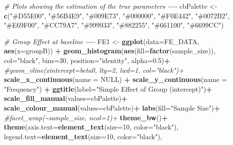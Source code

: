 \documentclass[
]{article}
\newenvironment{Shaded}{\begin{snugshade}}{\end{snugshade}}
\newcommand{\AttributeTok}[1]{\textcolor[rgb]{0.13,0.29,0.53}{#1}}
\newcommand{\CommentTok}[1]{\textcolor[rgb]{0.56,0.35,0.01}{\textit{#1}}}
\newcommand{\ConstantTok}[1]{\textcolor[rgb]{0.56,0.35,0.01}{#1}}
\newcommand{\DecValTok}[1]{\textcolor[rgb]{0.00,0.00,0.81}{#1}}
\newcommand{\FloatTok}[1]{\textcolor[rgb]{0.00,0.00,0.81}{#1}}
\newcommand{\FunctionTok}[1]{\textcolor[rgb]{0.13,0.29,0.53}{\textbf{#1}}}
\newcommand{\NormalTok}[1]{#1}
\newcommand{\OtherTok}[1]{\textcolor[rgb]{0.56,0.35,0.01}{#1}}
\newcommand{\SpecialCharTok}[1]{\textcolor[rgb]{0.81,0.36,0.00}{\textbf{#1}}}
\newcommand{\StringTok}[1]{\textcolor[rgb]{0.31,0.60,0.02}{#1}}
\begin{document}
\begin{Shaded}
\begin{Highlighting}[]
\CommentTok{\# Plots showing the estimation of the true parameters {-}{-}{-}{-}}
\NormalTok{cbPalette }\OtherTok{\textless{}{-}} \FunctionTok{c}\NormalTok{(}\StringTok{"\#D55E00"}\NormalTok{, }\StringTok{"\#56B4E9"}\NormalTok{, }\StringTok{"\#009E73"}\NormalTok{, }\StringTok{"\#000000"}\NormalTok{, }
               \StringTok{"\#F0E442"}\NormalTok{, }\StringTok{"\#0072B2"}\NormalTok{, }\StringTok{"\#E69F00"}\NormalTok{, }\StringTok{"\#CC79A7"}\NormalTok{,}
               \StringTok{"\#999933"}\NormalTok{, }\StringTok{"\#882255"}\NormalTok{, }\StringTok{"\#661100"}\NormalTok{, }\StringTok{"\#6699CC"}\NormalTok{)}


\CommentTok{\# Group Effect at baseline {-}{-}{-}{-}}
\NormalTok{FE1 }\OtherTok{\textless{}{-}} \FunctionTok{ggplot}\NormalTok{(}\AttributeTok{data=}\NormalTok{FE\_DATA, }\FunctionTok{aes}\NormalTok{(}\AttributeTok{x=}\NormalTok{groupB)) }\SpecialCharTok{+}
  \FunctionTok{geom\_histogram}\NormalTok{(}\FunctionTok{aes}\NormalTok{(}\AttributeTok{fill=}\FunctionTok{factor}\NormalTok{(sample\_size)), }\AttributeTok{col=}\StringTok{"black"}\NormalTok{, }\AttributeTok{bins=}\DecValTok{30}\NormalTok{,}
                 \AttributeTok{position=}\StringTok{"identity"}\NormalTok{, }\AttributeTok{alpha=}\FloatTok{0.5}\NormalTok{)}\SpecialCharTok{+}
  \CommentTok{\#geom\_vline(xintercept=beta0, lty=2, lwd=1, col="black")+}
  \FunctionTok{scale\_x\_continuous}\NormalTok{(}\AttributeTok{name =} \ConstantTok{NULL}\NormalTok{) }\SpecialCharTok{+}
  \FunctionTok{scale\_y\_continuous}\NormalTok{(}\AttributeTok{name =} \StringTok{"Frequency"}\NormalTok{) }\SpecialCharTok{+}
  \FunctionTok{ggtitle}\NormalTok{(}\AttributeTok{label=}\StringTok{"Simple Effect of Group (intercept)"}\NormalTok{)}\SpecialCharTok{+}
  \FunctionTok{scale\_fill\_manual}\NormalTok{(}\AttributeTok{values=}\NormalTok{cbPalette)}\SpecialCharTok{+}
  \FunctionTok{scale\_colour\_manual}\NormalTok{(}\AttributeTok{values=}\NormalTok{cbPalette)}\SpecialCharTok{+}
  \FunctionTok{labs}\NormalTok{(}\AttributeTok{fill=}\StringTok{"Sample Size"}\NormalTok{)}\SpecialCharTok{+}
  \CommentTok{\#facet\_wrap(\textasciitilde{}sample\_size, ncol=1)+}
  \FunctionTok{theme\_bw}\NormalTok{()}\SpecialCharTok{+}
  \FunctionTok{theme}\NormalTok{(}\AttributeTok{axis.text=}\FunctionTok{element\_text}\NormalTok{(}\AttributeTok{size=}\DecValTok{10}\NormalTok{, }\AttributeTok{color=}\StringTok{"black"}\NormalTok{),}
        \AttributeTok{legend.text=}\FunctionTok{element\_text}\NormalTok{(}\AttributeTok{size=}\DecValTok{10}\NormalTok{, }\AttributeTok{color=}\StringTok{"black"}\NormalTok{),}

\end{Highlighting}
\end{Shaded}
\end{document}
